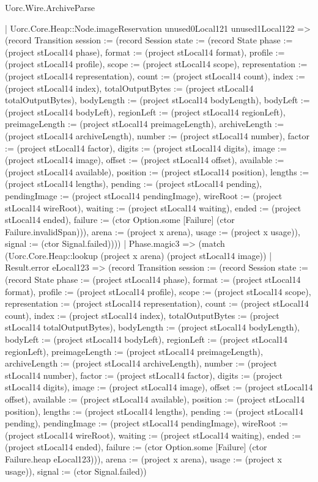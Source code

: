 \begin{lexlean}{Uorc.Wire.ArchiveParse}
\begin{semanticmodule}
{            | Uorc.Core.Heap::Node.imageReservation unused0Local121 unused1Local122 => (record Transition {session := (record Session {state := (record State {phase := (project stLocal14 phase), format := (project stLocal14 format), profile := (project stLocal14 profile), scope := (project stLocal14 scope), representation := (project stLocal14 representation), count := (project stLocal14 count), index := (project stLocal14 index), totalOutputBytes := (project stLocal14 totalOutputBytes), bodyLength := (project stLocal14 bodyLength), bodyLeft := (project stLocal14 bodyLeft), regionLeft := (project stLocal14 regionLeft), preimageLength := (project stLocal14 preimageLength), archiveLength := (project stLocal14 archiveLength), number := (project stLocal14 number), factor := (project stLocal14 factor), digits := (project stLocal14 digits), image := (project stLocal14 image), offset := (project stLocal14 offset), available := (project stLocal14 available), position := (project stLocal14 position), lengths := (project stLocal14 lengths), pending := (project stLocal14 pending), pendingImage := (project stLocal14 pendingImage), wireRoot := (project stLocal14 wireRoot), waiting := (project stLocal14 waiting), ended := (project stLocal14 ended), failure := (ctor Option.some [Failure] (ctor Failure.invalidSpan))}), arena := (project x arena), usage := (project x usage)}), signal := (ctor Signal.failed)})))
        | Phase.magic3 => (match (Uorc.Core.Heap::lookup (project x arena) (project stLocal14 image))
          | Result.error eLocal123 => (record Transition {session := (record Session {state := (record State {phase := (project stLocal14 phase), format := (project stLocal14 format), profile := (project stLocal14 profile), scope := (project stLocal14 scope), representation := (project stLocal14 representation), count := (project stLocal14 count), index := (project stLocal14 index), totalOutputBytes := (project stLocal14 totalOutputBytes), bodyLength := (project stLocal14 bodyLength), bodyLeft := (project stLocal14 bodyLeft), regionLeft := (project stLocal14 regionLeft), preimageLength := (project stLocal14 preimageLength), archiveLength := (project stLocal14 archiveLength), number := (project stLocal14 number), factor := (project stLocal14 factor), digits := (project stLocal14 digits), image := (project stLocal14 image), offset := (project stLocal14 offset), available := (project stLocal14 available), position := (project stLocal14 position), lengths := (project stLocal14 lengths), pending := (project stLocal14 pending), pendingImage := (project stLocal14 pendingImage), wireRoot := (project stLocal14 wireRoot), waiting := (project stLocal14 waiting), ended := (project stLocal14 ended), failure := (ctor Option.some [Failure] (ctor Failure.heap eLocal123))}), arena := (project x arena), usage := (project x usage)}), signal := (ctor Signal.failed)})
}
\end{semanticmodule}
\end{lexlean}
